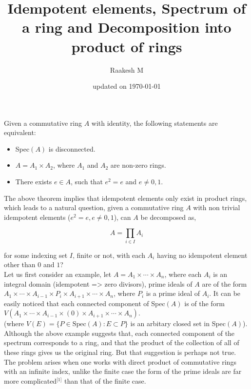 \documentclass[11pt,a4paper]{colorart}
\title{\Huge Idempotent elements, Spectrum of a ring and Decomposition into product of rings}
\author{Raakesh M}
\date{updated on \today}
\begin{document}
\maketitle


\begin{theorem}
	Given a commutative ring $A$ with identity, the following statements are equivalent:

	\begin{itemize}
		\item Spec$(A)$ is disconnected.
		\item $A = A_1 \times A_2$, where $A_1$ and $A_2$ are non-zero rings.
		\item There exists $e \in A$, such that $e^2 = e$ and $e \neq 0,1$.
	\end{itemize}

\end{theorem}

The above theorem implies that idempotent elements only exist in product rings, which leads to a natural question, given a commutative ring $A$ with non trivial idempotent elements ($e^2=e, e \neq 0,1$), can $A$ be decomposed as,

\[ A = \prod_{i \in I} A_i \]

for some indexing set $I$, finite or not, with each $A_i$ having no idempotent element other than $0$ and $1$?\\

Let us first consider an example, let $A = A_1 \times \cdots \times A_n$, where each $A_i$ is an integral domain (idempotent => zero divisors), prime ideals of $A$ are of the form $A_1 \times \cdots \times A_{i-1} \times P_i \times A_{i+1} \times \cdots \times A_n$, where $P_i$ is a prime ideal of $A_i$. It can be easily noticed that each connected component of Spec$(A)$ is of the form $V( A_1 \times \cdots \times A_{i-1} \times (0) \times A_{i+1} \times \cdots \times A_n)$.\\

(where $V(E) = \{P \in \text{Spec}(A) : E \subset P\}$ is an arbitary closed set in Spec$(A)$).\\

Although the above example suggests that, each connected component of the spectrum corresponds to a ring, and that the product of the collection of all of these rings gives us the original ring. But that suggestion is perhaps not true.\\ 

The problem arises when one works with direct product of commutative rings with an infinite index, unlike the finite case the form of the prime ideals are far more complicated$^\text{[1]}$ than that of the finite case.\\
\end{document}
